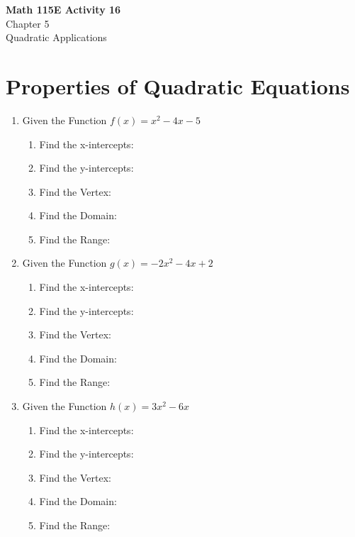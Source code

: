 \documentclass[12pt]{article}
\begin{document}
\begin{center}
    \Large \textbf{Math 115E Activity 16} \\
    \vspace{0.2cm}
    \normalsize Chapter 5 \\
    \normalsize Quadratic Applications
\end{center}
\vspace{-0.5cm}
\noindent
\section*{Properties of Quadratic Equations}

\noindent
\begin{enumerate}[label=\#\arabic*]
    \item Given the Function $f(x)=x^2-4x-5$
    \begin{enumerate}
        \item Find the x-intercepts:
        \\
        \item Find the y-intercepts:
        \\
        \item Find the Vertex:
        \\
        \item Find the Domain:
        \\
        \item Find the Range:
    \end{enumerate}
    \vspace{1cm}
    \item Given the Function $g(x)=-2x^2-4x+2$
    \begin{enumerate}
        \item Find the x-intercepts:
        \\
        \item Find the y-intercepts:
        \\
        \item Find the Vertex:
        \\
        \item Find the Domain:
        \\
        \item Find the Range:
    \end{enumerate}
    \vspace{1cm}
    \item Given the Function $h(x)=3x^2-6x$
    \begin{enumerate}
        \item Find the x-intercepts:
        \\
        \item Find the y-intercepts:
        \\
        \item Find the Vertex:
        \\
        \item Find the Domain:
        \\
        \item Find the Range:
    \end{enumerate}
\end{enumerate}
\end{document}
